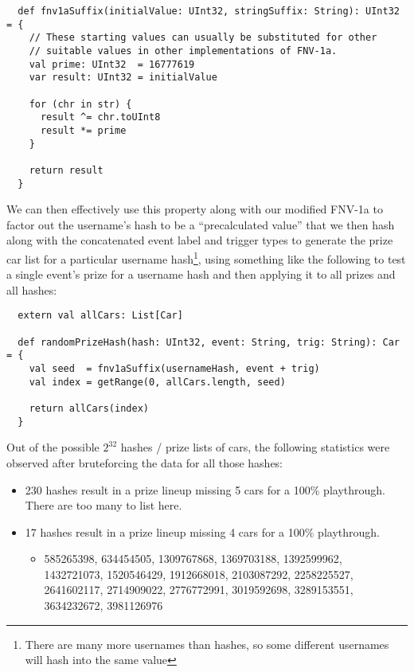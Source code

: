 \documentclass[14pt,a4paper,notitlepage]{extarticle}
\begin{document}
                \begin{lstlisting}
  def fnv1aSuffix(initialValue: UInt32, stringSuffix: String): UInt32 = {
    // These starting values can usually be substituted for other
    // suitable values in other implementations of FNV-1a.
    val prime: UInt32  = 16777619
    var result: UInt32 = initialValue

    for (chr in str) {
      result ^= chr.toUInt8
      result *= prime
    }

    return result
  }
                \end{lstlisting}

                We can then effectively use this property along with our modified FNV-1a to factor out
                the username's hash to be a ``precalculated value'' that we then hash along with the
                concatenated event label and trigger types to generate the prize car list for a
                particular username hash\footnote{There are many more usernames than hashes, so some
                different usernames will hash into the same value}, using something like the
                following to test a single event's prize for a username hash and then applying it to
                all prizes and all hashes:

            \begin{lstlisting}
  extern val allCars: List[Car]

  def randomPrizeHash(hash: UInt32, event: String, trig: String): Car = {
    val seed  = fnv1aSuffix(usernameHash, event + trig)
    val index = getRange(0, allCars.length, seed)

    return allCars(index)
  }
            \end{lstlisting}

                Out of the possible $2^{32}$ hashes / prize lists of cars, the following statistics
                were observed after bruteforcing the data for all those hashes:

                \begin{itemize}
                    \item 230 hashes result in a prize lineup missing 5 cars for a 100\% playthrough.
                          There are too many to list here.
                    \item 17 hashes result in a prize lineup missing 4 cars for a 100\% playthrough.
                    \begin{itemize}
                        \item 585265398, 634454505, 1309767868, 1369703188, 1392599962,\\1432721073, 1520546429, 1912668018, 2103087292, 2258225527,\\2641602117, 2714909022, 2776772991, 3019592698, 3289153551,\\3634232672, 3981126976
                    \end{itemize}
                \end{itemize}
\end{document}
